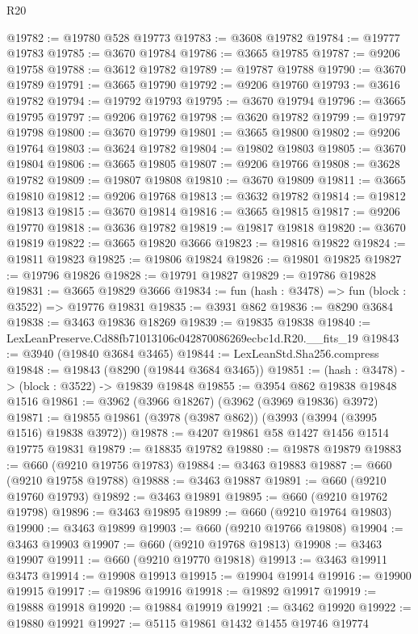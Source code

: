\begin{lexlean}{R20}
\begin{coremodule}
@19782 := @19780 @528 @19773
@19783 := @3608 @19782
@19784 := @19777 @19783
@19785 := @3670 @19784
@19786 := @3665 @19785
@19787 := @9206 @19758
@19788 := @3612 @19782
@19789 := @19787 @19788
@19790 := @3670 @19789
@19791 := @3665 @19790
@19792 := @9206 @19760
@19793 := @3616 @19782
@19794 := @19792 @19793
@19795 := @3670 @19794
@19796 := @3665 @19795
@19797 := @9206 @19762
@19798 := @3620 @19782
@19799 := @19797 @19798
@19800 := @3670 @19799
@19801 := @3665 @19800
@19802 := @9206 @19764
@19803 := @3624 @19782
@19804 := @19802 @19803
@19805 := @3670 @19804
@19806 := @3665 @19805
@19807 := @9206 @19766
@19808 := @3628 @19782
@19809 := @19807 @19808
@19810 := @3670 @19809
@19811 := @3665 @19810
@19812 := @9206 @19768
@19813 := @3632 @19782
@19814 := @19812 @19813
@19815 := @3670 @19814
@19816 := @3665 @19815
@19817 := @9206 @19770
@19818 := @3636 @19782
@19819 := @19817 @19818
@19820 := @3670 @19819
@19822 := @3665 @19820 @3666
@19823 := @19816 @19822
@19824 := @19811 @19823
@19825 := @19806 @19824
@19826 := @19801 @19825
@19827 := @19796 @19826
@19828 := @19791 @19827
@19829 := @19786 @19828
@19831 := @3665 @19829 @3666
@19834 := fun (hash : @3478) => fun (block : @3522) => @19776 @19831
@19835 := @3931 @862
@19836 := @8290 @3684
@19838 := @3463 @19836 @18269
@19839 := @19835 @19838
@19840 := LexLeanPreserve.Cd88fb71013106c042870086269ecbc1d.R20.__fits_19
@19843 := @3940 (@19840 @3684 @3465)
@19844 := LexLeanStd.Sha256.compress
@19848 := @19843 (@8290 (@19844 @3684 @3465))
@19851 := (hash : @3478) -> (block : @3522) -> @19839 @19848
@19855 := @3954 @862 @19838 @19848 @1516
@19861 := @3962 (@3966 @18267) (@3962 (@3969 @19836) @3972)
@19871 := @19855 @19861 (@3978 (@3987 @862)) (@3993 (@3994 (@3995 @1516) @19838 @3972))
@19878 := @4207 @19861 @58 @1427 @1456 @1514 @19775 @19831
@19879 := @18835 @19782
@19880 := @19878 @19879
@19883 := @660 (@9210 @19756 @19783)
@19884 := @3463 @19883
@19887 := @660 (@9210 @19758 @19788)
@19888 := @3463 @19887
@19891 := @660 (@9210 @19760 @19793)
@19892 := @3463 @19891
@19895 := @660 (@9210 @19762 @19798)
@19896 := @3463 @19895
@19899 := @660 (@9210 @19764 @19803)
@19900 := @3463 @19899
@19903 := @660 (@9210 @19766 @19808)
@19904 := @3463 @19903
@19907 := @660 (@9210 @19768 @19813)
@19908 := @3463 @19907
@19911 := @660 (@9210 @19770 @19818)
@19913 := @3463 @19911 @3473
@19914 := @19908 @19913
@19915 := @19904 @19914
@19916 := @19900 @19915
@19917 := @19896 @19916
@19918 := @19892 @19917
@19919 := @19888 @19918
@19920 := @19884 @19919
@19921 := @3462 @19920
@19922 := @19880 @19921
@19927 := @5115 @19861 @1432 @1455 @19746 @19774

\end{coremodule}
\end{lexlean}
